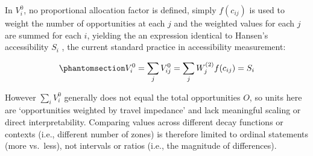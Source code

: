 \documentclass[
  10pt,
  letterpaper,
]{article}
\begin{document}
In \(V^0_i\), no proportional allocation factor is defined, simply
\(f(c_{ij})\) is used to weight the number of opportunities at each
\(j\) and the weighted values for each \(j\) are summed for each \(i\),
yielding the an expression identical to Hansen's accessibility \(S_i\)
\citep{hansen1959}, the current standard practice in accessibility
measurement:

\begin{equation}\phantomsection\label{eq-unconstrained-accessibility}{
V^0_i = \sum_j V^0_{ij} = \sum_j W^{(2)}_jf(c_{ij}) = S_i
}\end{equation}

However \(\sum_i V^0_{i}\) generally does not equal the total
opportunities \(O\), so units here are `opportunities weighted by travel
impedance' and lack meaningful scaling or direct interpretability.
Comparing values across different decay functions or contexts (i.e.,
different number of zones) is therefore limited to ordinal statements
(more vs.~less), not intervals or ratios (i.e., the magnitude of
differences).

\begin{table}

\caption{\label{tbl-simple-example-unconstrained-accessibility}Simple
system: unconstrained accessibility.}


\end{table}%
\end{document}
